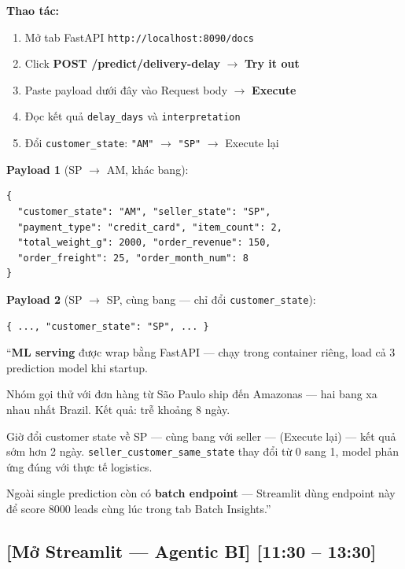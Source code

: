 \documentclass[12pt, a4paper]{article}
\newenvironment{speakerbox}[2]{%
  \begin{tcolorbox}[
    enhanced, breakable,
    colback=#1!6!white,
    colframe=#1,
    colbacktitle=#1,
    coltitle=white,
    fonttitle=\bfseries\large,
    title={#2},
    arc=4pt,
    boxrule=1.5pt,
    left=8pt, right=8pt, top=6pt, bottom=6pt,
  ]
}{%
  \end{tcolorbox}
}
\newcommand{\timing}[1]{%
  \hfill{\small\bfseries\color{gray}[#1]}%
}
\begin{document}
\begin{speakerbox}{p4color}{\faUser\ Người 4 · 9:00 -- 15:00}
\begin{demobox}
\textbf{Thao tác:}
\begin{enumerate}[leftmargin=1.5em, itemsep=2pt]
  \item Mở tab FastAPI \texttt{http://localhost:8090/docs}
  \item Click \textbf{POST /predict/delivery-delay} $\to$ \textbf{Try it out}
  \item Paste payload dưới đây vào Request body $\to$ \textbf{Execute}
  \item Đọc kết quả \texttt{delay\_days} và \texttt{interpretation}
  \item Đổi \texttt{customer\_state}: \texttt{"AM"} $\to$ \texttt{"SP"} $\to$ Execute lại
\end{enumerate}

\vspace{0.3em}
\textbf{Payload 1} (SP $\to$ AM, khác bang):
\begin{verbatim}
{
  "customer_state": "AM", "seller_state": "SP",
  "payment_type": "credit_card", "item_count": 2,
  "total_weight_g": 2000, "order_revenue": 150,
  "order_freight": 25, "order_month_num": 8
}
\end{verbatim}

\textbf{Payload 2} (SP $\to$ SP, cùng bang — chỉ đổi \texttt{customer\_state}):
\begin{verbatim}
{ ..., "customer_state": "SP", ... }
\end{verbatim}
\end{demobox}

\begin{scriptbox}
``\textbf{ML serving} được wrap bằng FastAPI --- chạy trong container riêng, load cả 3
prediction model khi startup.

Nhóm gọi thử với đơn hàng từ São Paulo ship đến Amazonas ---
hai bang xa nhau nhất Brazil. Kết quả: trễ khoảng 8 ngày.

Giờ đổi customer state về SP --- cùng bang với seller --- (Execute lại) ---
kết quả sớm hơn 2 ngày. \texttt{seller\_customer\_same\_state} thay đổi từ 0 sang 1,
model phản ứng đúng với thực tế logistics.

Ngoài single prediction còn có \textbf{batch endpoint} --- Streamlit dùng endpoint
này để score 8000 leads cùng lúc trong tab Batch Insights.''
\end{scriptbox}

\subsection*{[Mở Streamlit — Agentic BI] \timing{11:30 -- 13:30}}


\end{speakerbox}
\end{document}
